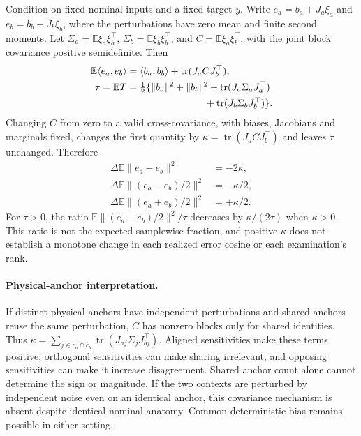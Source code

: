 Condition on fixed nominal inputs and a fixed target $y$. Write $e_a=b_a+J_a\xi_a$ and $e_b=b_b+J_b\xi_b$, where the perturbations have zero mean and finite second moments. Let $\Sigma_a=\mathbb E\xi_a\xi_a^\top$, $\Sigma_b=\mathbb E\xi_b\xi_b^\top$, and $C=\mathbb E\xi_a\xi_b^\top$, with the joint block covariance positive semidefinite. Then
\begin{align}
\mathbb E\langle e_a,e_b\rangle
 &=\langle b_a,b_b\rangle+\operatorname{tr}(J_a C J_b^\top),\\
\tau=\mathbb E T
 &=\tfrac12\{\|b_a\|^2+\|b_b\|^2+\operatorname{tr}(J_a\Sigma_aJ_a^\top)\nonumber\\
 &\hspace{28mm}+\operatorname{tr}(J_b\Sigma_bJ_b^\top)\}.
\end{align}
Changing $C$ from zero to a valid cross-covariance, with biases, Jacobians and marginals fixed, changes the first quantity by $\kappa=\operatorname{tr}(J_a C J_b^\top)$ and leaves $\tau$ unchanged. Therefore
\begin{align}
\Delta\mathbb E\|e_a-e_b\|^2&=-2\kappa,\\
\Delta\mathbb E\|(e_a-e_b)/2\|^2&=-\kappa/2,\\
\Delta\mathbb E\|(e_a+e_b)/2\|^2&=+\kappa/2.
\end{align}
For $\tau>0$, the ratio $\mathbb E\|(e_a-e_b)/2\|^2/\tau$ decreases by $\kappa/(2\tau)$ when $\kappa>0$. This ratio is not the expected samplewise fraction, and positive $\kappa$ does not establish a monotone change in each realized error cosine or each examination's rank.

\paragraph{Physical-anchor interpretation.}
If distinct physical anchors have independent perturbations and shared anchors reuse the same perturbation, $C$ has nonzero blocks only for shared identities. Thus $\kappa=\sum_{j\in c_a\cap c_b}\operatorname{tr}(J_{aj}\Sigma_jJ_{bj}^\top)$. Aligned sensitivities make these terms positive; orthogonal sensitivities can make sharing irrelevant, and opposing sensitivities can make it increase disagreement. Shared anchor count alone cannot determine the sign or magnitude. If the two contexts are perturbed by independent noise even on an identical anchor, this covariance mechanism is absent despite identical nominal anatomy. Common deterministic bias remains possible in either setting.

